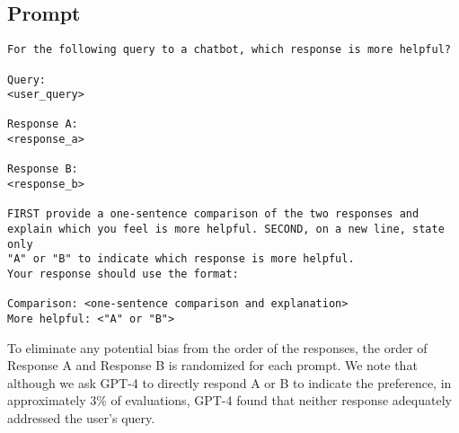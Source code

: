 \documentclass{article} %
\begin{document}
\subsection{Prompt}
\label{appendix:prompt}
\lstset{
  basicstyle=\small\ttfamily, %
  frame=single
}
\begin{lstlisting}
For the following query to a chatbot, which response is more helpful? 

Query: 
<user_query>

Response A: 
<response_a>

Response B: 
<response_b>

FIRST provide a one-sentence comparison of the two responses and 
explain which you feel is more helpful. SECOND, on a new line, state only 
"A" or "B" to indicate which response is more helpful. 
Your response should use the format:

Comparison: <one-sentence comparison and explanation>
More helpful: <"A" or "B">
\end{lstlisting}
To eliminate any potential bias from the order of the responses, the order of Response A and Response B is randomized for each prompt. We note that although we ask GPT-4 to directly respond A or B to indicate the preference, in approximately 3\% of evaluations, GPT-4 found that neither response adequately addressed the user's query.
\newpage
\end{document}
